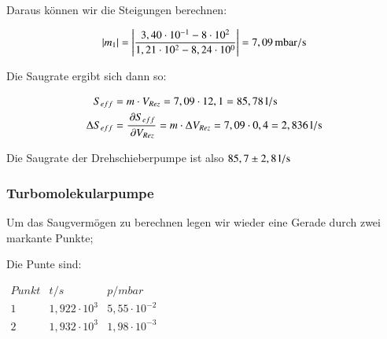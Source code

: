 Daraus können wir die Steigungen berechnen:

\begin{align*}
|m_1| &= \left| \frac{3,40 \cdot 10^{-1} - 8 \cdot 10^{2}}{1,21 \cdot 10^{2} - 8,24 \cdot 10^{0}} \right| = \unit[7,09]{mbar/s} \\
\end{align*}

Die Saugrate ergibt sich dann so:

\begin{align*}
S_{eff} &= m \cdot V_{Rez} = 7,09 \cdot 12,1 = \unit[85,78]{l/s} \\
\Delta S_{eff} &= \frac{\p S_{eff}}{\p V_{Rez}} = m \cdot \Delta V_{Rez} = 7,09 \cdot 0,4 = \unit[2,836]{l/s}
\end{align*}


Die Saugrate der Drehschieberpumpe ist also $\unit[85,7 \pm 2,8]{l/s}$


\subsubsection*{Turbomolekularpumpe}

Um das Saugvermögen zu berechnen legen wir wieder eine Gerade durch zwei markante Punkte;

\begin{figure}[h]
\end{figure}

Die Punte sind:

\begin{center}
	$
	\begin{matrix}
	Punkt	& t/s & p/mbar \\ 
	1	& 1,922 \cdot 10^{3} & 5,55 \cdot 10^{-2} \\ 
	2	& 1,932 \cdot 10^{3} & 1,98 \cdot 10^{-3} \\ 
	
	\end{matrix} 
	$	
\end{center}



